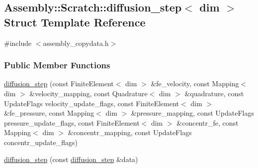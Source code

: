 \hypertarget{struct_assembly_1_1_scratch_1_1diffusion__step}{}\subsection{Assembly\+:\+:Scratch\+:\+:diffusion\+\_\+step$<$ dim $>$ Struct Template Reference}
\label{struct_assembly_1_1_scratch_1_1diffusion__step}


{\ttfamily \#include $<$assembly\+\_\+copydata.\+h$>$}

\subsubsection*{Public Member Functions}
\begin{DoxyCompactItemize}
\item 
\hyperlink{struct_assembly_1_1_scratch_1_1diffusion__step_a5769d06dbf6b99961da088f11f24cce3}{diffusion\+\_\+step} (const Finite\+Element$<$ dim $>$ \&fe\+\_\+velocity, const Mapping$<$ dim $>$ \&velocity\+\_\+mapping, const Quadrature$<$ dim $>$ \&quadrature, const Update\+Flags velocity\+\_\+update\+\_\+flags, const Finite\+Element$<$ dim $>$ \&fe\+\_\+pressure, const Mapping$<$ dim $>$ \&pressure\+\_\+mapping, const Update\+Flags pressure\+\_\+update\+\_\+flags, const Finite\+Element$<$ dim $>$ \&concentr\+\_\+fe, const Mapping$<$ dim $>$ \&concentr\+\_\+mapping, const Update\+Flags concentr\+\_\+update\+\_\+flags)
\item 
\hyperlink{struct_assembly_1_1_scratch_1_1diffusion__step_acd94c7791e03515bef5208066a1a0a26}{diffusion\+\_\+step} (const \hyperlink{struct_assembly_1_1_scratch_1_1diffusion__step}{diffusion\+\_\+step} \&data)
\end{DoxyCompactItemize}
